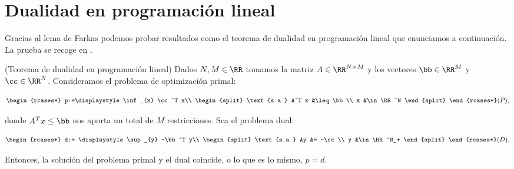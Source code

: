 \section{Dualidad en programación lineal}
Gracias al lema de Farkas podemos probar resultados como el teorema de dualidad en programación lineal que enunciamos a continuación. La prueba se recoge en \cite{borwein}.
\bigskip
\begin{teoremaBox}(Teorema de dualidad en programación lineal)
	Dados $ N,M \in \RR $ tomamos la matriz $ A \in \RR^{N\times M} $ y los vectores $ \bb \in \RR^M $ y $ \cc \in \RR^N $. Consideramos el problema de optimización primal:
	
	\begin{equation*}\label{primal}
	\begin{rcases*}
	p:=\displaystyle \inf_{x} \cc^T x\\
	\begin{split}
	\text{s.a } A^T x &\leq \bb \\
	x &\in \RR^N
	\end{split}
	\end{rcases*} (P),
	\end{equation*}
	
	donde $ A^T x \leq \bb $ nos aporta un total de $ M $ restricciones. Sea el problema dual:
	
	\begin{equation*}\label{dual}
	\begin{rcases*}
	d:= \displaystyle \sup_{y} -\bb^T y\\
	\begin{split}
	\text{s.a } Ay &= -\cc \\
	y &\in \RR^N_+
	\end{split}
	\end{rcases*} (D).
	\end{equation*}
	
	Entonces, la solución del problema primal y el dual coincide, o lo que es lo mismo, $ p = d $.
\end{teoremaBox}
